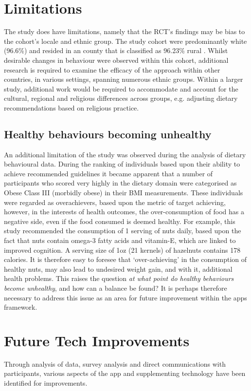 \section{Limitations}
The study does have limitations, namely that the RCT's findings may be bias to the cohort’s locale and ethnic group. The study cohort were predominantly white (96.6\%) and resided in an county that is classified as 96.23\% rural \cite{UnitedStatesCensusBureau}. Whilst desirable changes in behaviour were observed within this cohort, additional research is required to examine the efficacy of the approach within other countries, in various settings, spanning numerous ethnic groups.
Within a larger study, additional work would be required to accommodate and account for the cultural, regional and religious differences across groups, e.g. adjusting dietary recommendations based on religious practice.

\subsection{Healthy behaviours becoming unhealthy}
An additional limitation of the study was observed during the analysis of dietary behavioural data.
During the ranking of individuals based upon their ability to achieve recommended guidelines it became apparent that a number of participants who scored very highly in the dietary domain were categorised as Obese Class III (morbidly obese) in their BMI measurements. These individuals were regarded as overachievers, based upon the metric of target achieving, however, in the interests of health outcomes, the over-consumption of food has a negative side, even if the food consumed is deemed healthy.
For example, this study recommended the consumption of 1 serving of nuts daily, based upon the fact that nuts contain omega-3 fatty acids and vitamin-E, which are linked to improved cognition. A serving size of 1oz (21 kernels) of hazelnuts contains 178 calories. It is therefore easy to foresee that `over-achieving' in the consumption of healthy nuts, may also lead to undesired weight gain, and with it, additional health problems.
This raises the question \textit{at what point do healthy behaviours become unhealthy}, and how can a balance be found?
\newline It is perhaps therefore necessary to address this issue as an area for future improvement within the apps framework.

\section{Future Tech Improvements} \label{section: future-improvements}
Through analysis of data, survey analysis and direct communications with participants, various aspects of the app and supplementing technology have been identified for improvements.

